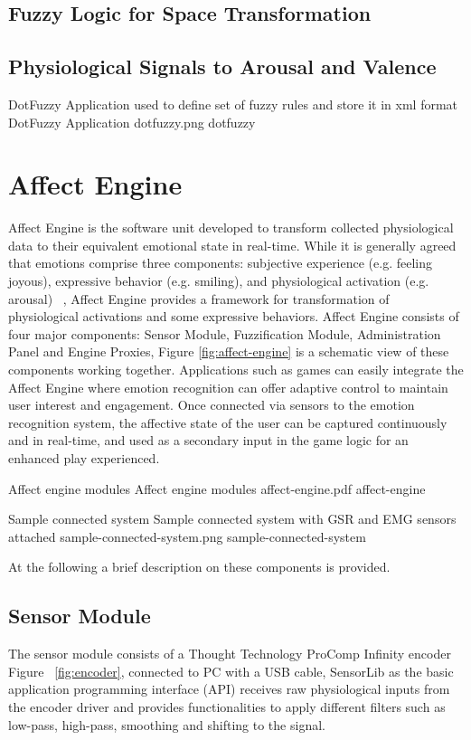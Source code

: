 \subsection{Fuzzy Logic for Space Transformation}
\subsection{Physiological Signals to Arousal and Valence}

\img
{DotFuzzy Application used to define set of fuzzy rules and store it in xml format}
{DotFuzzy Application}
{dotfuzzy.png}
{dotfuzzy}

\section{Affect Engine} %
Affect Engine is the software unit developed to transform collected physiological data to their equivalent emotional state in real-time. While it is generally agreed that emotions comprise three components: subjective experience (e.g. feeling joyous), expressive behavior (e.g. smiling), and physiological activation (e.g. arousal) ~\cite{scherer1993neuroscience}, Affect Engine provides a framework for transformation of physiological activations and some expressive behaviors. Affect Engine consists of four major components: Sensor Module, Fuzzification Module, Administration Panel and Engine Proxies, Figure \ref{fig:affect-engine} is a schematic view of these components working together. Applications such as games can easily integrate the Affect Engine where emotion recognition can offer adaptive control to maintain user interest and engagement. Once connected via sensors to the emotion recognition system, the affective state of the user can be captured continuously and in real-time, and used as a secondary input in the game logic for an enhanced play experienced.

\img
{Affect engine modules}
{Affect engine modules}
{affect-engine.pdf}
{affect-engine}

\img
{Sample connected system}
{Sample connected system with GSR and EMG sensors attached}
{sample-connected-system.png}
{sample-connected-system}

At the following a brief description on these components is provided.

\subsection{Sensor Module} %
The sensor module consists of a Thought Technology ProComp Infinity encoder ~\cite{tt2013procomp} Figure ~\ref{fig:encoder}, connected to PC with a USB cable, SensorLib as the basic application programming interface (API) receives raw physiological inputs from the encoder driver and provides functionalities to apply different filters such as low-pass, high-pass, smoothing and shifting to the signal.

